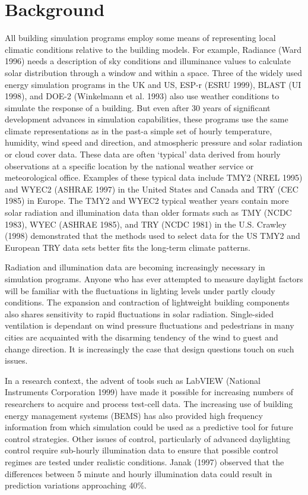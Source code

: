 \section{Background}\label{background}

All building simulation programs employ some means of representing local climatic conditions relative to the building models. For example, Radiance (Ward 1996) needs a description of sky conditions and illuminance values to calculate solar distribution through a window and within a space. Three of the widely used energy simulation programs in the UK and US, ESP-r (ESRU 1999), BLAST (UI 1998), and DOE-2 (Winkelmann et al. 1993) also use weather conditions to simulate the response of a building. But even after 30 years of significant development advances in simulation capabilities, these programs use the same climate representations as in the past-a simple set of hourly temperature, humidity, wind speed and direction, and atmospheric pressure and solar radiation or cloud cover data. These data are often `typical' data derived from hourly observations at a specific location by the national weather service or meteorological office. Examples of these typical data include TMY2 (NREL 1995) and WYEC2 (ASHRAE 1997) in the United States and Canada and TRY (CEC 1985) in Europe. The TMY2 and WYEC2 typical weather years contain more solar radiation and illumination data than older formats such as TMY (NCDC 1983), WYEC (ASHRAE 1985), and TRY (NCDC 1981) in the U.S. Crawley (1998) demonstrated that the methods used to select data for the US TMY2 and European TRY data sets better fits the long-term climate patterns.

Radiation and illumination data are becoming increasingly necessary in simulation programs. Anyone who has ever attempted to measure daylight factors will be familiar with the fluctuations in lighting levels under partly cloudy conditions. The expansion and contraction of lightweight building components also shares sensitivity to rapid fluctuations in solar radiation. Single-sided ventilation is dependant on wind pressure fluctuations and pedestrians in many cities are acquainted with the disarming tendency of the wind to guest and change direction. It is increasingly the case that design questions touch on such issues.

In a research context, the advent of tools such as LabVIEW (National Instruments Corporation 1999) have made it possible for increasing numbers of researchers to acquire and process test-cell data. The increasing use of building energy management systems (BEMS) has also provided high frequency information from which simulation could be used as a predictive tool for future control strategies. Other issues of control, particularly of advanced daylighting control require sub-hourly illumination data to ensure that possible control regimes are tested under realistic conditions. Janak (1997) observed that the differences between 5 minute and hourly illumination data could result in prediction variations approaching 40\%.


